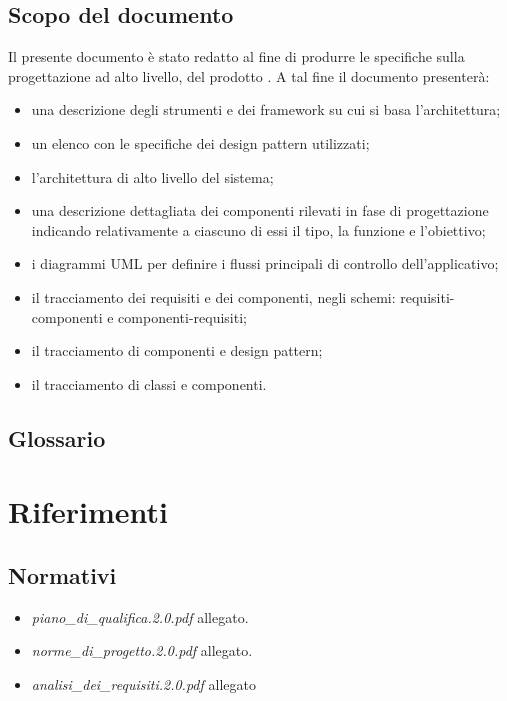 \subsection{Scopo del documento}
Il presente documento è stato redatto al fine di produrre le specifiche sulla progettazione ad alto livello, del prodotto \caName. A tal fine il documento presenterà:
\begin{itemize}
    \item una descrizione degli strumenti e dei framework su cui si basa l'architettura;
	\item un elenco con le specifiche dei design pattern utilizzati;
	\item l'architettura di alto livello del sistema;
	\item una descrizione dettagliata dei componenti rilevati in fase di progettazione indicando relativamente a ciascuno di essi il tipo, la funzione e l'obiettivo;
	\item i diagrammi UML per definire i flussi principali di controllo dell'applicativo;
	\item il tracciamento dei requisiti e dei componenti, negli schemi: requisiti-componenti e componenti-requisiti;
	\item il tracciamento di componenti e design pattern;
	\item il tracciamento di classi e componenti.
\end{itemize}

\subsection{Glossario}
\glossaryIntro

\clearpage
\section{Riferimenti}

\subsection{Normativi}
\begin{itemize}
\item[] \textit{piano\_di\_qualifica.2.0.pdf} allegato.
\item[] \textit{norme\_di\_progetto.2.0.pdf} allegato.
\item[] \textit{analisi\_dei\_requisiti.2.0.pdf} allegato
\end{itemize}

